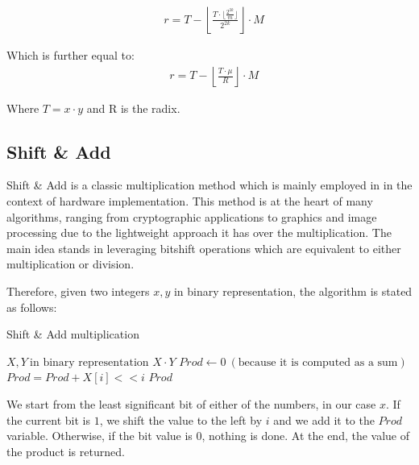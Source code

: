 \documentclass[11pt,
  titlepage=false,
  abstract=on,
]{scrreprt}
\begin{document}
\begin{align*}
  &r = T - \left\lfloor \frac{T \cdot \lfloor \frac{2^{2k}}{m}\rfloor}{2^{2k}} \right\rfloor \cdot M
\end{align*}

Which is further equal to:
\begin{align*}
  &r = T - \left\lfloor \frac{T \cdot \mu}{R} \right\rfloor \cdot M
\end{align*}

Where $T = x \cdot y$ and R is the radix.

\subsection{Shift \& Add}

Shift \& Add is a classic multiplication method which is mainly employed in in the context of hardware implementation.
This method is at the heart of many algorithms, ranging from cryptographic applications to graphics and image processing due to the lightweight
approach it has over the multiplication. The main idea stands in leveraging bitshift operations which are equivalent to either multiplication or division.

Therefore, given two integers $x, y$ in binary representation, the algorithm is stated as follows:

\begin{algorithm}
  \caption{Shift \& Add multiplication}
  \label{alg:montgomery}
  \begin{algorithmic}[1]
  \REQUIRE \( X, Y\ \text{in binary representation}\)
  \renewcommand{\algorithmicensure}{\textbf{Output:}}
  \ENSURE \(X \cdot Y\)
  \STATE \( Prod \leftarrow 0\ (\text{because it is computed as a sum}) \)
          \STATE \( Prod = Prod + X[i] << i \)
      \ENDIF
  \ENDFOR
  \RETURN \( Prod \)
  \end{algorithmic}
\end{algorithm}

We start from the least significant bit of either of the numbers, in our case $x$. If the current bit is $1$, we shift the value to the left by $i$ and
we add it to the $Prod$ variable. Otherwise, if the bit value is 0, nothing is done. At the end, the value of the product is returned.


\end{document}
